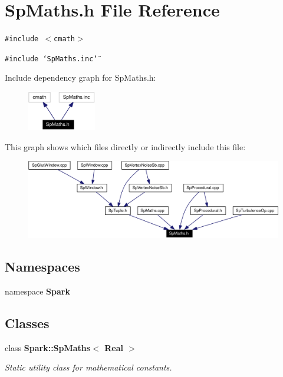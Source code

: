\section{Sp\-Maths.h File Reference}
\label{SpMaths_8h}
{\tt \#include $<$cmath$>$}\par
{\tt \#include \char`\"{}Sp\-Maths.inc\char`\"{}}\par


Include dependency graph for Sp\-Maths.h:\begin{figure}[H]
\begin{center}
\leavevmode
\includegraphics[width=85pt]{SpMaths_8h__incl}
\end{center}
\end{figure}


This graph shows which files directly or indirectly include this file:\begin{figure}[H]
\begin{center}
\leavevmode
\includegraphics[width=324pt]{SpMaths_8h__dep__incl}
\end{center}
\end{figure}
\subsection*{Namespaces}
\begin{CompactItemize}
\item 
namespace {\bf Spark}
\end{CompactItemize}
\subsection*{Classes}
\begin{CompactItemize}
\item 
class {\bf Spark::Sp\-Maths$<$ Real $>$}
\begin{CompactList}\small\item\em Static utility class for mathematical constants. \item\end{CompactList}\end{CompactItemize}
